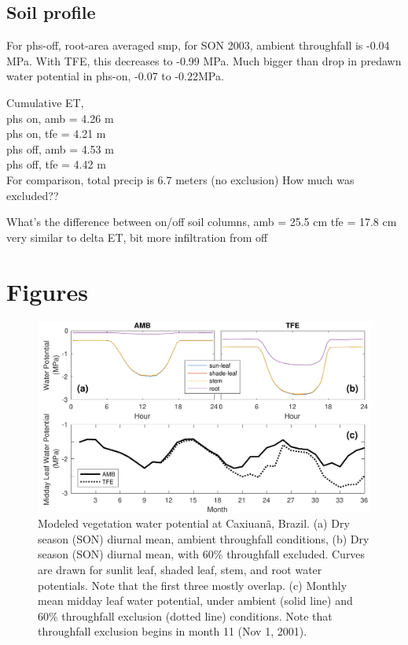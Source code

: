\documentclass[draft,linenumbers]{agujournal}
\begin{document}
\subsection{Soil profile}

For phs-off, root-area averaged smp, for SON 2003, ambient throughfall is -0.04 MPa.
With TFE, this decreases to -0.99 MPa. 
Much bigger than drop in predawn water potential in phs-on, -0.07 to -0.22MPa.

Cumulative ET, \\
phs on, amb = 4.26 m \\
phs on, tfe = 4.21 m \\
phs off, amb = 4.53 m \\
phs off, tfe = 4.42 m \\

For comparison, total precip is 6.7 meters (no exclusion)
How much was excluded??

What's the difference between on/off soil columns, 
amb = 25.5 cm
tfe = 17.8 cm
very similar to delta ET, bit more infiltration from off





    
\clearpage    

\section{Figures}
  \begin{figure}[h]
     \centering
     \includegraphics[width=30pc]{../figs2/fig2.pdf}
     \caption{Modeled vegetation water potential at  Caxiuan\~a, Brazil.
     (a) Dry season (SON) diurnal mean, ambient throughfall conditions,
     (b) Dry season (SON) diurnal mean, with 60\% throughfall excluded.
     Curves are drawn for sunlit leaf, shaded leaf, stem, and root water potentials. Note that the first three mostly overlap.
     (c) Monthly mean midday leaf water potential, under ambient (solid line) and 60\% throughfall exclusion (dotted line) conditions.
     Note that throughfall exclusion begins in month 11 (Nov 1, 2001).
     }
     \label{fig:vwp}
  \end{figure}
  
\end{document}
